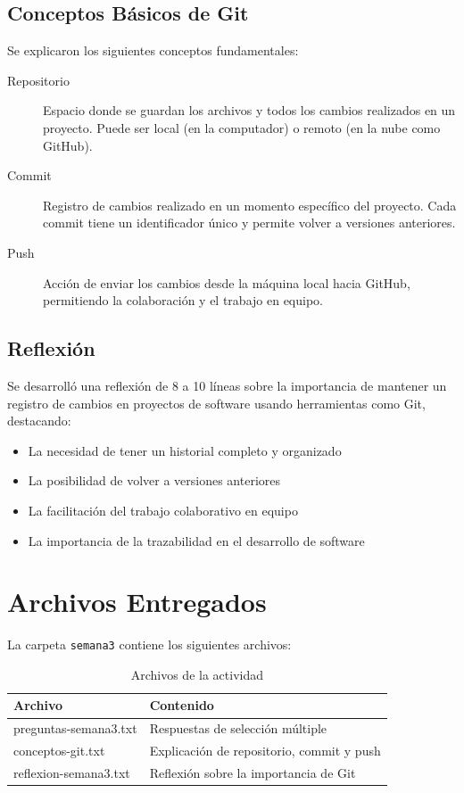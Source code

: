 \documentclass[12pt,a4paper]{article}
\begin{document}
\subsection{Conceptos Básicos de Git}

Se explicaron los siguientes conceptos fundamentales:

\begin{description}
    \item[Repositorio] Espacio donde se guardan los archivos y todos los cambios realizados en un proyecto. Puede ser local (en la computador) o remoto (en la nube como GitHub).
    
    \item[Commit] Registro de cambios realizado en un momento específico del proyecto. Cada commit tiene un identificador único y permite volver a versiones anteriores.
    
    \item[Push] Acción de enviar los cambios desde la máquina local hacia GitHub, permitiendo la colaboración y el trabajo en equipo.
\end{description}

\subsection{Reflexión}

Se desarrolló una reflexión de 8 a 10 líneas sobre la importancia de mantener un registro de cambios en proyectos de software usando herramientas como Git, destacando:

\begin{itemize}
    \item La necesidad de tener un historial completo y organizado
    \item La posibilidad de volver a versiones anteriores
    \item La facilitación del trabajo colaborativo en equipo
    \item La importancia de la trazabilidad en el desarrollo de software
\end{itemize}

\section{Archivos Entregados}

La carpeta \texttt{semana3} contiene los siguientes archivos:

\begin{table}[h]
\centering
\begin{tabular}{|l|l|}
\hline
\textbf{Archivo} & \textbf{Contenido} \\
\hline
preguntas-semana3.txt & Respuestas de selección múltiple \\
\hline
conceptos-git.txt & Explicación de repositorio, commit y push \\
\hline
reflexion-semana3.txt & Reflexión sobre la importancia de Git \\
\hline
\end{tabular}
\caption{Archivos de la actividad}
\end{table}
\end{document}

